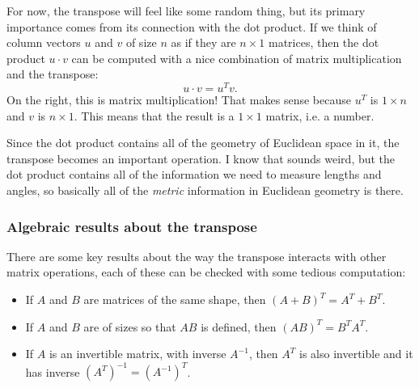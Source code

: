 \documentclass[10pt,]{book}
\theoremstyle{plain}
\numberwithin{equation}{section}
\begin{document}
      For now, the transpose will feel like some random thing, but its primary
      importance comes from its connection with the dot product. If we think of
      column vectors \(u\) and \(v\) of size \(n\) as if they are \(n \times 1\)
      matrices, then the dot product \(u \cdot v\) can be computed with a nice
      combination of matrix multiplication and the transpose:
      \[
      u \cdot v = u^T v .
      \]
      On the right, this is matrix multiplication! That makes sense because
      \(u^T\) is \(1 \times n\) and \(v\) is \(n \times 1\). This
      means that the result
      is a \(1\times 1\) matrix, i.e. a number.
\par

      Since the dot product contains all of the geometry of Euclidean space in
      it, the transpose becomes an important operation. I know that sounds weird,
      but the dot product contains all of the information we need to measure
      lengths and angles, so basically all of the \emph{metric} information in
      Euclidean geometry is there.
\typeout{************************************************}
\typeout{************************************************}
\subsubsection[Algebraic results about the transpose]{Algebraic results about the transpose}\label{subsubsection-29}

        There are some key results about the way the transpose interacts with
        other matrix operations, each of these can be checked with some tedious
        computation:
\begin{itemize}
\item{}
          If \(A\) and \(B\) are matrices of the same shape, then
          \((A+B)^T = A^T + B^T\).
        \item{}
          If \(A\) and \(B\) are of sizes so that \(AB\) is defined,
          then \((AB)^T = B^T A^T\).
        \item{}
          If \(A\) is an invertible matrix, with inverse \(A^{-1}\),
          then \(A^T\) is also invertible and it has inverse
          \(\left(A^T\right)^{-1} = \left(A^{-1}\right)^T \).
        \end{itemize}
\typeout{************************************************}
\typeout{************************************************}
\end{document}
